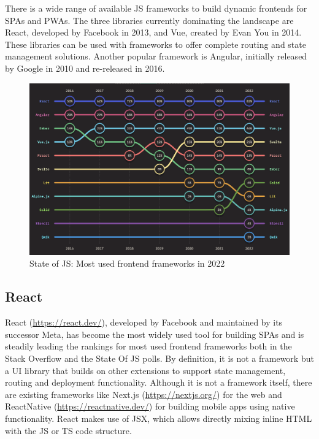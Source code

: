 There is a wide range of available \ac{JS} frameworks to build dynamic frontends for \ac{SPA}s and \ac{PWA}s. The three libraries currently dominating the landscape are React, developed by Facebook in 2013, and Vue, created by Evan You in 2014. These libraries can be used with frameworks to offer complete routing and state management solutions. Another popular framework is Angular, initially released by Google in 2010 and re-released in 2016.

\begin{figure}[h]
    \centering
    \includegraphics[scale=0.4]{04_Artefakte/01_Abbildungen/stateofjs-usage-frontend-frameworks-2022}
    \caption[Most used frontend frameworks in 2022]{State of JS: Most used frontend frameworks in 2022\protect\footnotemark}
    \label{fig:mostUsedFrameworks}
\end{figure}

\subsection{React}

React (\url{https://react.dev/}), developed by Facebook and maintained by its successor Meta, has become the most widely used tool for building \ac{SPA}s and is steadily leading the rankings for most used frontend frameworks both in the Stack Overflow \parencite{stackOverflowPollWebFrameworks23} and the State Of JS \parencite{mostUsedFrontendFrameworks22} polls. By definition, it is not a framework but a \ac{UI} library that builds on other extensions to support state management, routing and deployment functionality. Although it is not a framework itself, there are existing frameworks like Next.js (\url{https://nextjs.org/}) for the web and ReactNative (\url{https://reactnative.dev/}) for building mobile apps using native functionality. React makes use of \ac{JSX}, which allows directly mixing inline \ac{HTML} with the \ac{JS} or \ac{TS} code structure.

